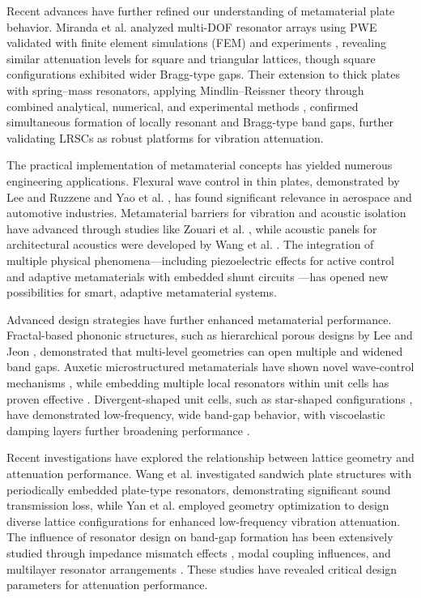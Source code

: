 \documentclass[review,numbers,sort&compress]{elsarticle}
\begin{document}
Recent advances have further refined our understanding of metamaterial plate behavior. Miranda et al. analyzed multi-DOF resonator arrays using PWE validated with finite element simulations (FEM) and experiments \cite{MIRANDA2019480}, revealing similar attenuation levels for square and triangular lattices, though square configurations exhibited wider Bragg-type gaps. Their extension to thick plates with spring--mass resonators, applying Mindlin--Reissner theory through combined analytical, numerical, and experimental methods \cite{MIRANDAJR2020138}, confirmed simultaneous formation of locally resonant and Bragg-type band gaps, further validating LRSCs as robust platforms for vibration attenuation.


The practical implementation of metamaterial concepts has yielded numerous engineering applications. Flexural wave control in thin plates, demonstrated by Lee and Ruzzene \cite{Lee2015} and Yao et al. \cite{Yao2014}, has found significant relevance in aerospace and automotive industries. Metamaterial barriers for vibration and acoustic isolation have advanced through studies like Zouari et al. \cite{Zouari2018}, while acoustic panels for architectural acoustics were developed by Wang et al. \cite{Wang2020}. The integration of multiple physical phenomena---including piezoelectric effects for active control \cite{Torrent2013} and adaptive metamaterials with embedded shunt circuits \cite{Lera2019}---has opened new possibilities for smart, adaptive metamaterial systems.

Advanced design strategies have further enhanced metamaterial performance. Fractal-based phononic structures, such as hierarchical porous designs by Lee and Jeon \cite{Lee2020}, demonstrated that multi-level geometries can open multiple and widened band gaps. Auxetic microstructured metamaterials have shown novel wave-control mechanisms \cite{ZhiTao2022}, while embedding multiple local resonators within unit cells has proven effective \cite{DalPoggetto2021}. Divergent-shaped unit cells, such as star-shaped configurations \cite{Kumar2019}, have demonstrated low-frequency, wide band-gap behavior, with viscoelastic damping layers further broadening performance \cite{DalPoggetto2021}.

Recent investigations have explored the relationship between lattice geometry and attenuation performance. Wang et al. \cite{Wang2021} investigated sandwich plate structures with periodically embedded plate-type resonators, demonstrating significant sound transmission loss, while Yan et al. \cite{Yan2022} employed geometry optimization to design diverse lattice configurations for enhanced low-frequency vibration attenuation. The influence of resonator design on band-gap formation has been extensively studied through impedance mismatch effects \cite{Li2021}, modal coupling influences, and multilayer resonator arrangements \cite{Wei2021}. These studies have revealed critical design parameters for attenuation performance.
\end{document}
